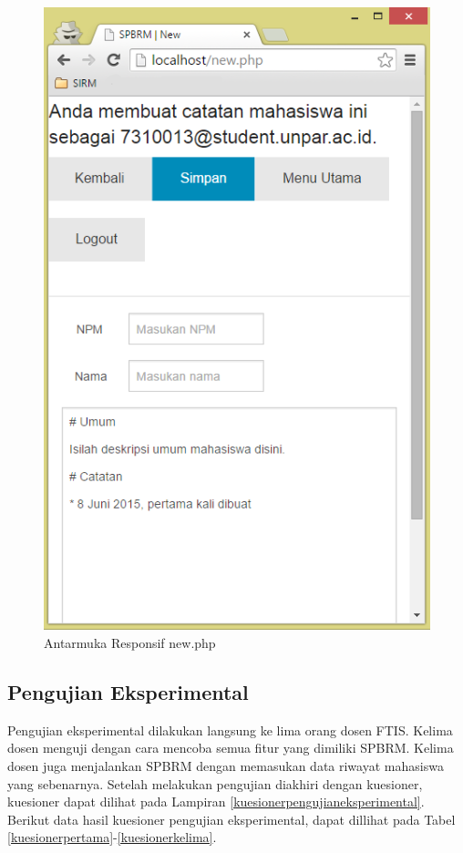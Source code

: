 \begin{figure}[H]
\centering
\includegraphics[scale=0.5]{Gambar/pengujian19.png}
\caption[Antarmuka Responsif new.php]{Antarmuka Responsif new.php} 
\label{fig:responsifnew}
\end{figure}

\subsection{Pengujian Eksperimental}
\label{sec:pengujianeksperimantal}

Pengujian eksperimental dilakukan langsung ke lima orang dosen FTIS. Kelima dosen menguji dengan cara mencoba semua fitur yang dimiliki SPBRM. Kelima dosen juga menjalankan SPBRM dengan memasukan data riwayat mahasiswa yang sebenarnya. Setelah melakukan pengujian diakhiri dengan kuesioner, kuesioner dapat dilihat pada Lampiran \ref{kuesionerpengujianeksperimental}. Berikut data hasil kuesioner pengujian eksperimental, dapat dillihat pada Tabel \ref{kuesionerpertama}-\ref{kuesionerkelima}.

